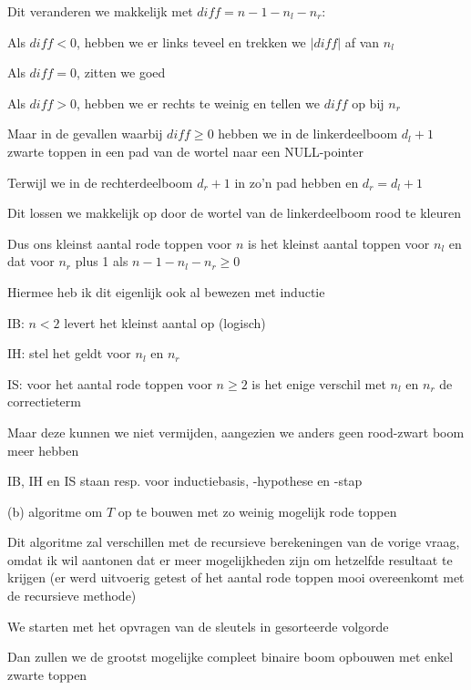 \documentclass{article}
\begin{document}
Dit veranderen we makkelijk met $diff = n - 1 - n_l - n_r$:

Als $diff < 0$, hebben we er links teveel en trekken we $| diff |$ af van $n_l$

Als $diff = 0$, zitten we goed

Als $diff > 0$, hebben we er rechts te weinig en tellen we $diff$ op bij $n_r$

Maar in de gevallen waarbij $diff \geq 0$ hebben we in de linkerdeelboom $d_l + 1$ zwarte toppen in een pad van de wortel naar een NULL-pointer

Terwijl we in de rechterdeelboom $d_r + 1$ in zo'n pad hebben en $d_r = d_l + 1$

Dit lossen we makkelijk op door de wortel van de linkerdeelboom rood te kleuren

Dus ons kleinst aantal rode toppen voor $n$ is het kleinst aantal toppen voor $n_l$ en dat voor $n_r$ plus 1 als $n - 1 - n_l - n_r \geq 0$

\vspace{0.2cm}

Hiermee heb ik dit eigenlijk ook al bewezen met inductie

IB: $n < 2$ levert het kleinst aantal op (logisch)

IH: stel het geldt voor $n_l$ en $n_r$

IS: voor het aantal rode toppen voor $n \geq 2$ is het enige verschil met $n_l$ en $n_r$ de correctieterm

Maar deze kunnen we niet vermijden, aangezien we anders geen rood-zwart boom meer hebben

\normalsize IB, IH en IS staan resp. voor inductiebasis, -hypothese en -stap 

\vspace{0.5cm}

\Large (b) algoritme om $T$ op te bouwen met zo weinig mogelijk rode toppen
\vspace{0.3cm}

\large
Dit algoritme zal verschillen met de recursieve berekeningen van de vorige vraag, omdat ik wil aantonen dat er meer mogelijkheden zijn om hetzelfde resultaat te krijgen (er werd uitvoerig getest of het aantal rode toppen mooi overeenkomt met de recursieve methode)

\vspace{0.2cm}

We starten met het opvragen van de sleutels in gesorteerde volgorde

Dan zullen we de grootst mogelijke compleet binaire boom opbouwen met enkel zwarte toppen
\end{document}
